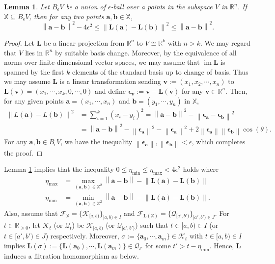 \documentclass[11pt]{article}
\newtheorem{lemma}[theorem]{Lemma}
\newcommand{\bbR}{\mathbb{R}}
\newcommand{\norm}[1]{\left\lVert#1\right\rVert}
\newcommand{\R}{\mathbb{R}} %
\newcommand{\im}{\operatorname{im}}
\newcommand{\matL}{\mathbf{L}} %
\newcommand{\ptcloudx}{\mathbb{X}} %
\newcommand{\veca}{\mathbf{a}} %
\newcommand{\vecb}{\mathbf{b}} %
\newcommand{\vecv}{\mathbf{v}} %
\begin{document}
\begin{lemma}\label{main1}
	Let $B_{\epsilon}V$ be a union of $\epsilon$-ball over a points in the subspace $V$ in $\R^{n}$. If $\ptcloudx \subseteq B_{\epsilon}V$, then for any two points $\veca,\vecb \in \ptcloudx$, 
	$$\norm{\veca-\vecb}^{2}-4\epsilon^{2} \leq \norm{\matL(\veca)-\matL(\vecb)}^{2} \leq \norm{\veca-\vecb}^{2}.$$
\end{lemma}
\begin{proof}
	Let $\matL$ be a linear projection from $\R^{n}$ to $V \cong \R^{k}$ with $n>k$. We may regard that $V$ lies in $\R^{n}$ by suitable basis change. Moreover, by the equivalence of all norms over finite-dimensional vector spaces, we may assume that $\im\matL$ is spanned by the first $k$ elements of the standard basis up to change of basis. Thus we may assume $\matL$ is a linear transformation sending $\vecv:=(x_{1},x_{2},\cdots, x_{n})$ to $\matL(\vecv)=(x_{1},\cdots, x_{k},0,\cdots,0)$ and define $\boldsymbol{\epsilon}_{\vecv}:= \vecv-\matL(\vecv)$ for any $\mathbf{v} \in \bbR^n$. Then, for any given points $\veca = (x_{1},\cdots, x_{n})$ and $\vecb = (y_{1},\cdots, y_{n})$ in $\ptcloudx$,
	\begin{align*}
	\norm{L(\veca)-L(\vecb)}^{2} &= \sum_{i=1}^{k}(x_{i}-y_{i})^{2} = \norm{\veca-\vecb}^{2}- \norm{\boldsymbol{\epsilon}_{\veca}-\boldsymbol{\epsilon}_{\vecb}}^{2}
	\\
	&=\norm{\veca-\vecb}^{2} -\norm{\boldsymbol{\epsilon}_{\veca}}^{2}-\norm{\boldsymbol{\epsilon}_{\veca}}^{2} + 2\norm{\boldsymbol{\epsilon}_{\veca}}\norm{\boldsymbol{\epsilon}_{\vecb}}\cos(\theta).
	\end{align*}
	For any $\veca,\vecb \in B_{\epsilon}V$, we have the inequality  $\norm{\boldsymbol{\epsilon}_{\veca}}, \norm{\boldsymbol{\epsilon}_{\vecb}} < \epsilon$, which completes the proof.
\end{proof}

Lemma \ref{main1} implies that the inequality $0 \leq \eta_{\min} \leq \eta_{\max} < 4\epsilon^{2}$ holds where
\begin{align*}
\eta_{\max} &= \max_{(\veca,\vecb) \in \ptcloudx^{2}}\norm{\veca-\vecb}-\norm{\matL(\veca)-\matL(\vecb)}\\
\eta_{\min} &= \min_{(\veca,\vecb) \in \ptcloudx^{2}}\norm{\veca-\vecb}-\norm{\matL(\veca)-\matL(\vecb)}.
\end{align*}
Also, assume that $\mathcal{F}_{\ptcloudx}=\{ \mathcal{K}_{[a,b)}\}_{[a,b) \in I}$ and $\mathcal{F}_{\mathbf{L}(\ptcloudx)}=\{ \mathcal{Q}_{[a',b')}\}_{[a',b') \in J}$. For $t \in \R_{\geq0}$, let $\mathcal{K}_{t}$ (or $\mathcal{Q}_{t}$) be $\mathcal{K}_{[a,b)}$  (or $\mathcal{Q}_{[a',b')}$) such that $t \in [a,b) \in I$ (or $t \in [a',b') \in J$) respectively. Moreover, $\sigma:=\{\veca_{0},\cdots, \veca_{m} \} \in \mathcal{K}_{t}$ with $t \in [a,b) \in I$ implies $\matL(\sigma):=\{\matL(\veca_{0}),\cdots, \matL(\veca_{m}) \} \in \mathcal{Q}_{t'}$ for some $t'>t-\eta_{\min}$. Hence, $\matL$ induces a filtration homomorphism as below.
\end{document}
